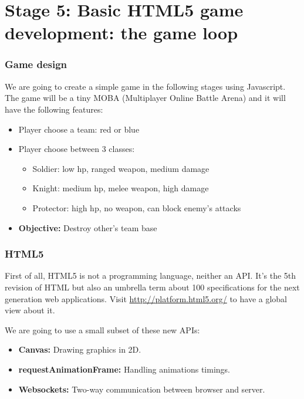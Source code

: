 \section{Stage 5: Basic HTML5 game development: the game loop}

\begin{frame}[fragile]
\end{frame}

\begin{frame}[fragile]
  \frametitle{Game design}

  We are going to create a simple game in the following stages using Javascript. The game will be a tiny MOBA (Multiplayer Online Battle Arena) and it will have the following features:

  \pause

  \begin{itemize}
    \pause \item Player choose a team: red or blue
    \pause \item Player choose between 3 classes:
      \begin{itemize}
        \item Soldier: low hp, ranged weapon, medium damage
        \item Knight: medium hp, melee weapon, high damage
        \item Protector: high hp, no weapon, can block enemy's attacks
      \end{itemize}
    \pause \item \textbf{Objective:} Destroy other's team base
  \end{itemize}
\end{frame}

\begin{frame}[fragile]
  \frametitle{HTML5}

  First of all, HTML5 is not a programming language, neither an API. It's the 5th revision of HTML but also an umbrella term about 100 specifications for the next generation web applications.
  Visit \url{http://platform.html5.org/} to have a global view about it.

  \pause

  We are going to use a small subset of these new APIs:
  \begin{itemize}
    \pause \item \textbf{Canvas:} Drawing graphics in 2D.
    \pause \item \textbf{requestAnimationFrame:} Handling animations timings.
    \pause \item \textbf{Websockets:} Two-way communication between browser and server.
  \end{itemize}
\end{frame}

